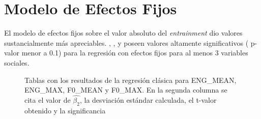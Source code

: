 \section{Modelo de Efectos Fijos}

El modelo de efectos fijos sobre el valor absoluto del \emph{entrainment} dio valores sustancialmente más apreciables. \ENGMAX, \ENGMEAN, \FOMEAN y \NOISETOHARMONICS poseen valores altamente significativos ( p-valor menor a 0.1) para la regresión con efectos fijos para al menos 3 variables sociales.

\begin{figure}

\caption{Tablas con los resultados de la regresión clásica para ENG\_MEAN, ENG\_MAX, F0\_MEAN y F0\_MAX. En la segunda columna se cita el valor de $\widehat{\beta_2}$, la desviación estándar calculada, el t-valor obtenido y la significancia}\label{regresion_clasica_tabla}

\end{figure}
